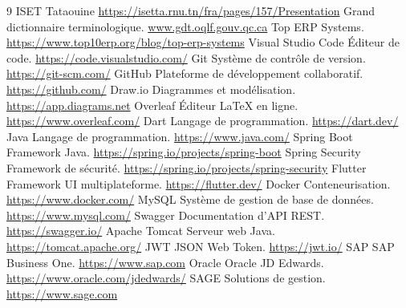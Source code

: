 \adjustmtc
\renewcommand\bibname{NETOGRAPHIE}
\begin{thebibliography}{9}
\thispagestyle{MyStyle}
 ISET Tataouine \url{https://isetta.rnu.tn/fra/pages/157/Presentation}
 Grand dictionnaire terminologique. \url{www.gdt.oqlf.gouv.qc.ca}
 Top ERP Systems. \url{https://www.top10erp.org/blog/top-erp-systems}
 Visual Studio Code Éditeur de code. \url{https://code.visualstudio.com/}
 Git Système de contrôle de version. \url{https://git-scm.com/}
 GitHub Plateforme de développement collaboratif. \url{https://github.com/}
 Draw.io Diagrammes et modélisation. \url{https://app.diagrams.net}
 Overleaf Éditeur LaTeX en ligne. \url{https://www.overleaf.com/}
 Dart Langage de programmation. \url{https://dart.dev/}
 Java Langage de programmation. \url{https://www.java.com/}
 Spring Boot Framework Java. \url{https://spring.io/projects/spring-boot}
 Spring Security Framework de sécurité. \url{https://spring.io/projects/spring-security}
 Flutter Framework UI multiplateforme. \url{https://flutter.dev/}
 Docker Conteneurisation. \url{https://www.docker.com/}
 MySQL Système de gestion de base de données. \url{https://www.mysql.com/}
 Swagger Documentation d'API REST. \url{https://swagger.io/}
 Apache Tomcat Serveur web Java. \url{https://tomcat.apache.org/}
 JWT JSON Web Token. \url{https://jwt.io/}
 SAP SAP Business One. \url{https://www.sap.com}
 Oracle Oracle JD Edwards. \url{https://www.oracle.com/jdedwards/}
 SAGE Solutions de gestion. \url{https://www.sage.com}
\end{thebibliography}